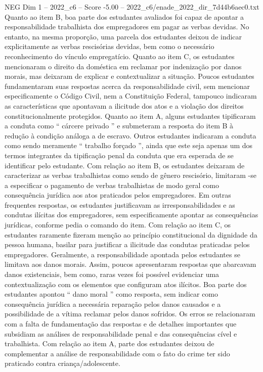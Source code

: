 \begin{textsample}{NEG Dim 1 – 2022\_c6 – Score -5.00 – 2022\_c6/enade\_2022\_dir\_7d44b6aec0.txt}
Quanto ao item B, boa parte dos estudantes avaliados foi capaz de apontar a responsabilidade trabalhista dos empregadores em pagar as verbas devidas.
No entanto, na mesma proporção, uma parcela dos estudantes deixou de indicar explicitamente as verbas rescisórias devidas, bem como o necessário reconhecimento do vínculo empregatício.
Quanto ao item C, os estudantes mencionaram o direito da doméstica em reclamar por indenização por danos morais, mas deixaram de explicar e contextualizar a situação.
Poucos estudantes fundamentaram suas respostas acerca da responsabilidade civil, sem mencionar especificamente o Código Civil, nem a Constituição Federal, tampouco indicaram as características que apontavam a ilicitude dos atos e a violação dos direitos constitucionalmente protegidos.
Quanto ao item A, alguns estudantes tipificaram a conduta como “ cárcere privado ” e submeteram a resposta do item B à redução à condição análoga a de escravo.
Outros estudantes indicaram a conduta como sendo meramente “ trabalho forçado ”, ainda que este seja apenas um dos termos integrantes da tipificação penal da conduta que era esperada de se identificar pelo estudante.
Com relação ao item B, os estudantes deixaram de caracterizar as verbas trabalhistas como sendo de gênero rescisório, limitaram -se a especificar o pagamento de verbas trabalhistas de modo geral como consequência jurídica aos atos praticados pelos empregadores.
Em outras frequentes respostas, os estudantes justificavam as irresponsabilidades e as condutas ilícitas dos empregadores, sem especificamente apontar as consequências jurídicas, conforme pedia o comando do item.
Com relação ao item C, os estudantes raramente fizeram menção ao princípio constitucional da dignidade da pessoa humana, basilar para justificar a ilicitude das condutas praticadas pelos empregadores.
Geralmente, a responsabilidade apontada pelos estudantes se limitava aos danos morais.
Assim, poucos apresentaram respostas que abarcavam danos existenciais, bem como, raras vezes foi possível evidenciar uma contextualização com os elementos que configuram atos ilícitos.
Boa parte dos estudantes apontou “ dano moral ” como resposta, sem indicar como consequência jurídica a necessária reparação pelos danos causados e a possibilidade de a vítima reclamar pelos danos sofridos.
Os erros se relacionaram com a falta de fundamentação das respostas e de detalhes importantes que subsidiam as análises de responsabilidade penal e das consequências cível e trabalhista.
Com relação ao item A, parte dos estudantes deixou de complementar a análise de responsabilidade com o fato do crime ter sido praticado contra criança/adolescente.

\end{textsample}
